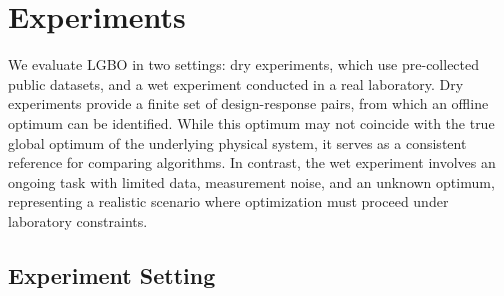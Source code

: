 \documentclass{article} %
\newtheorem{remark}{Remark}
\begin{document}
\section{Experiments}
\label{sec:exp}

We evaluate LGBO in two settings: dry experiments, which use pre-collected public datasets, and a wet experiment conducted in a real laboratory. Dry experiments provide a finite set of design-response pairs, from which an offline optimum can be identified. While this optimum may not coincide with the true global optimum of the underlying physical system, it serves as a consistent reference for comparing algorithms. In contrast, the wet experiment involves an ongoing task with limited data, measurement noise, and an unknown optimum, representing a realistic scenario where optimization must proceed under laboratory constraints.


\subsection{Experiment Setting}
\label{sec:baselines}
\captionsetup[subfigure]{justification=raggedright,singlelinecheck=false}
\end{document}
